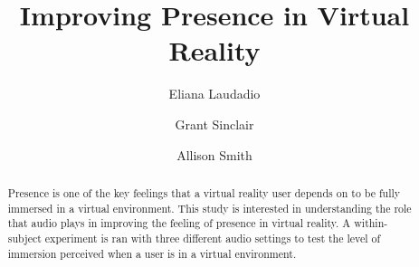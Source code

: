 \documentclass[manuscript,screen,review]{acmart}
\begin{document}
\title{Improving Presence in Virtual Reality}

\author{Eliana Laudadio}

\author{Grant Sinclair}
  
\author{Allison Smith}


\renewcommand{\shortauthors}{Laudadio and Sinclair, et al.}

\begin{abstract}
  Presence is one of the key feelings that a virtual reality user depends on to be fully immersed in a virtual environment. This study is interested in understanding the role that audio plays in improving the feeling of presence in virtual reality. A within-subject experiment is ran with three different audio settings to test the level of immersion perceived when a user is in a virtual environment.
\end{abstract}




\maketitle
\end{document}
